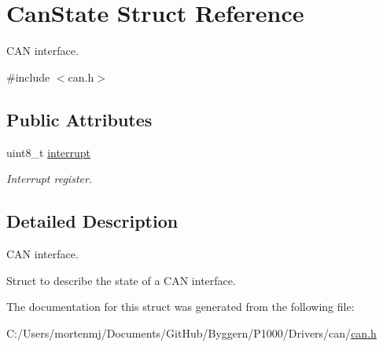 \hypertarget{struct_can_state}{\section{Can\-State Struct Reference}
\label{struct_can_state}
}


C\-A\-N interface.  




{\ttfamily \#include $<$can.\-h$>$}

\subsection*{Public Attributes}
\begin{DoxyCompactItemize}
\item 
\hypertarget{struct_can_state_ad0cb6c55a5dead717e39d9d8b7ada358}{uint8\-\_\-t \hyperlink{struct_can_state_ad0cb6c55a5dead717e39d9d8b7ada358}{interrupt}}\label{struct_can_state_ad0cb6c55a5dead717e39d9d8b7ada358}

\begin{DoxyCompactList}\small\item\em Interrupt register. \end{DoxyCompactList}\end{DoxyCompactItemize}


\subsection{Detailed Description}
C\-A\-N interface. 

Struct to describe the state of a C\-A\-N interface. 

The documentation for this struct was generated from the following file\-:\begin{DoxyCompactItemize}
\item 
C\-:/\-Users/mortenmj/\-Documents/\-Git\-Hub/\-Byggern/\-P1000/\-Drivers/can/\hyperlink{can_8h}{can.\-h}\end{DoxyCompactItemize}
